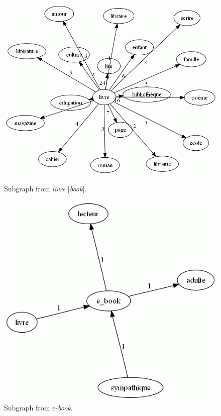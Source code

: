 \documentclass[english]{textolivre}
\begin{document}
\begin{figure}[htbp]
 \centering
 \begin{minipage}{.45\textwidth}
 \includegraphics[width=\textwidth]{Fig9.png}
 \caption{Subgraph from \textit{livre} [\textit{book}].}
 \label{fig9}
 \end{minipage}%
 \qquad
 \begin{minipage}{0.45\textwidth}
 \includegraphics[width=\textwidth]{Fig10.png}
 \caption{Subgraph from e-\textit{book}.}
 \label{fig10}
 \end{minipage}%
\end{figure}
\end{document}
